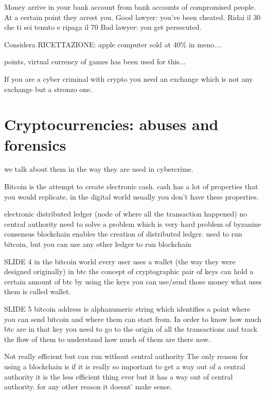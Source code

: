                 Money arrive in your bank account from bank accounts of compromised people.
                At a certain point they arrest you.
                Good lawyer: you've been cheated. Ridai il 30 che ti sei tenuto e ripaga il 70
                Bad lawyer: you get persecuted.

        Considera RICETTAZIONE: apple computer sold at 40\% in meno....

        points, virtual currency of games has been used for this...  

        If you are a cyber criminal with crypto you need an exchange which is not any exchange but a stronzo one.


\chapter{Cryptocurrencies: abuses and forensics}
    we talk about them in the way they are used in cybercrime.

    Bitcoin is the attempt to create electronic cash.
    cash has a lot of properties that you would replicate, in the digital world usually you don't have these properties.

    electronic distributed ledger (node of where all the transaction happened)
        no central authority
        need to solve a problem which is very hard
        problem of byzanine consensus
        blockchain enables the creation of distributed ledger.
        used to run bitcoin, but you can use any other ledger to run blockchain

SLIDE 4
    in the bitcoin world every user uses a wallet (the way they were designed originally)
    in btc the concept of cryptographic pair of keys can hold a certain amount of btc
    by using the keys you can use/send those money
    what uses them is called wallet.

SLIDE 5
    bitcoin address is alphanumeric string which identifies a point where you can send bitcoin
    and where them can start from.
    In order to know how much btc are in that key you need to go to the origin of all the transactions and track the flow of them to understand how much of them are there now.

    Not really efficient but can run without central authority 
    The only reason for using a blockchain is if it is really so important to get a way out of a central authority
    it is the less efficient thing ever but it has a way out of central authority.
    for any other reason it doesnt' make sense.

